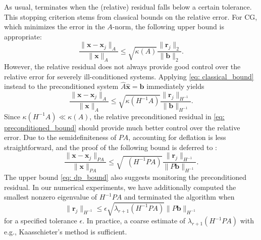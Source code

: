 \documentclass{article}
\numberwithin{equation}{section}
\DeclareMathOperator{\keff}{\kappa_{\operatorname{eff}}}
\theoremstyle{definition}
\begin{document}
As usual,  terminates when the (relative) residual falls below a certain tolerance. This stopping criterion stems from classical bounds on the relative error. For CG, which minimizes the error in the $A$-norm, the following upper bound is appropriate: 
\begin{equation}
\label{eq: classical_bound}
    \frac{\|\bm{x}-\bm{x}_j\|_A}{\|\bm{x}\|_A} \leq \sqrt{\kappa(A)} \frac{\|\bm{r}_j\|_2}{\|\bm{b}\|_2}.
\end{equation}
However, the relative residual does not always provide good control over the relative error for severely ill-conditioned systems. Applying \eqref{eq: classical_bound} instead to the preconditioned system $\hat{A}\hat{\bm{x}}=\hat{\bm{b}}$ immediately yields
\begin{equation}
\label{eq: preconditioned_bound}
    \frac{\|\bm{x}-\bm{x}_j\|_A}{\|\bm{x}\|_A} \leq \sqrt{\kappa(H^{-1}A)} \frac{\|\bm{r}_j\|_{H^{-1}}}{\|\bm{b}\|_{H^{-1}}}.
\end{equation}
Since $\kappa(H^{-1}A) \ll \kappa(A)$, the relative preconditioned residual in \eqref{eq: preconditioned_bound} should provide much better control over the relative error. Due to the semidefiniteness of $PA$, accounting for deflation is less straightforward, and the proof of the following bound is deferred to :
\begin{equation}
\label{eq: dp_bound}
    \frac{\|\bm{x}-\bm{x}_j\|_{PA}}{\|\bm{x}\|_{PA}} \leq \sqrt{\keff(H^{-1}PA)} \frac{\|\bm{r}_j\|_{H^{-1}}}{\|P\bm{b}\|_{H^{-1}}}.
\end{equation}
The upper bound \eqref{eq: dp_bound} also suggests monitoring the preconditioned residual. In our numerical experiments, we have additionally computed the smallest nonzero eigenvalue of $H^{-1}PA$ and terminated the algorithm when
\begin{equation}
\label{eq: stopping_condition}
    \|\bm{r}_j\|_{H^{-1}} \leq \epsilon \sqrt{\lambda_{r+1}(H^{-1}PA)}\|P\bm{b}\|_{H^{-1}}
\end{equation}
for a specified tolerance $\epsilon$. In practice, a coarse estimate of $\lambda_{r+1}(H^{-1}PA)$ with e.g., Kaasschieter's method \cite{kaasschieter1988practical} is sufficient.
\end{document}
